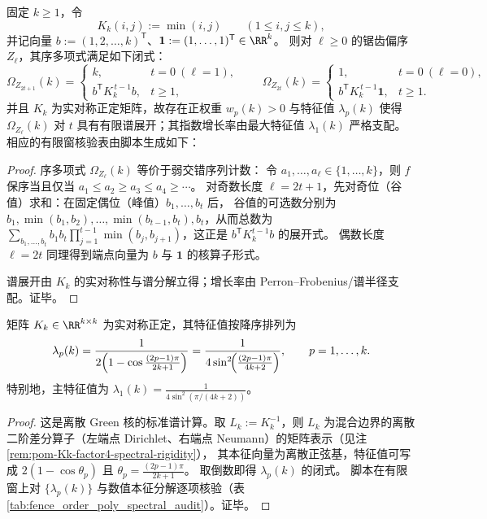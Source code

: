 \begin{theorem}[锯齿序多项式的核算子表示与谱展开]\label{thm:pom-fence-order-poly-spectral}
固定 \(k\ge 1\)，令
\[
K_k(i,j):=\min(i,j)\qquad(1\le i,j\le k),
\]
并记向量 \(b:=(1,2,\dots,k)^{\mathsf T}\)、\(\mathbf 1:=(1,\dots,1)^{\mathsf T}\in\RR^k\)。
则对 \(\ell\ge 0\) 的锯齿偏序 \(Z_\ell\)，其序多项式满足如下闭式：
\[
\Omega_{Z_{2t+1}}(k)=
\begin{cases}
k,& t=0\ (\ell=1),\\
b^{\mathsf T}K_k^{\,t-1}b,& t\ge 1,
\end{cases}
\qquad
\Omega_{Z_{2t}}(k)=
\begin{cases}
1,& t=0\ (\ell=0),\\
b^{\mathsf T}K_k^{\,t-1}\mathbf 1,& t\ge 1.
\end{cases}
\]
并且 \(K_k\) 为实对称正定矩阵，故存在正权重 \(w_p(k)>0\) 与特征值 \(\lambda_p(k)\) 使得
\(\Omega_{Z_\ell}(k)\) 对 \(t\) 具有有限谱展开；其指数增长率由最大特征值 \(\lambda_1(k)\) 严格支配。
相应的有限窗核验表由脚本生成如下：

\end{theorem}
\begin{proof}
序多项式 \(\Omega_{Z_\ell}(k)\) 等价于弱交错序列计数：
令 \(a_1,\dots,a_\ell\in\{1,\dots,k\}\)，则 \(f\) 保序当且仅当
\(
a_1\le a_2\ge a_3\le a_4\ge\cdots
\)。
对奇数长度 \(\ell=2t+1\)，先对奇位（谷值）求和：在固定偶位（峰值）\(b_1,\dots,b_t\) 后，
谷值的可选数分别为 \(b_1,\min(b_1,b_2),\dots,\min(b_{t-1},b_t),b_t\)，从而总数为
\(\sum_{b_1,\dots,b_t} b_1b_t\prod_{j=1}^{t-1}\min(b_j,b_{j+1})\)，这正是 \(b^{\mathsf T}K_k^{t-1}b\) 的展开式。
偶数长度 \(\ell=2t\) 同理得到端点向量为 \(b\) 与 \(\mathbf 1\) 的核算子形式。
\par
谱展开由 \(K_k\) 的实对称性与谱分解立得；增长率由 Perron--Frobenius/谱半径支配。证毕。
\end{proof}

\begin{lemma}[\texorpdfstring{\(K_k(i,j)=\min(i,j)\)}{K_k(i,j)=min(i,j)} 的完全谱闭式]\label{lem:pom-Kk-eigenvalues}
矩阵 \(K_k\in\RR^{k\times k}\) 为实对称正定，其特征值按降序排列为
\[
\lambda_p(k)=\frac{1}{2\Bigl(1-\cos\frac{(2p-1)\pi}{2k+1}\Bigr)}
=\frac{1}{4\sin^2\!\Bigl(\frac{(2p-1)\pi}{4k+2}\Bigr)},
\qquad p=1,\dots,k.
\]
特别地，主特征值为
\(
\lambda_1(k)=\frac{1}{4\sin^2(\pi/(4k+2))}
\)。
\end{lemma}
\begin{proof}
这是离散 Green 核的标准谱计算。取 \(L_k:=K_k^{-1}\)，则 \(L_k\) 为混合边界的离散二阶差分算子（左端点 Dirichlet、右端点 Neumann）的矩阵表示（见注 \ref{rem:pom-Kk-factor4-spectral-rigidity}），
其本征向量为离散正弦基，特征值可写成 \(2(1-\cos\theta_p)\) 且 \(\theta_p=\frac{(2p-1)\pi}{2k+1}\)。
取倒数即得 \(\lambda_p(k)\) 的闭式。
脚本在有限窗上对 \(\{\lambda_p(k)\}\) 与数值本征分解逐项核验（表 \ref{tab:fence_order_poly_spectral_audit}）。证毕。
\end{proof}

